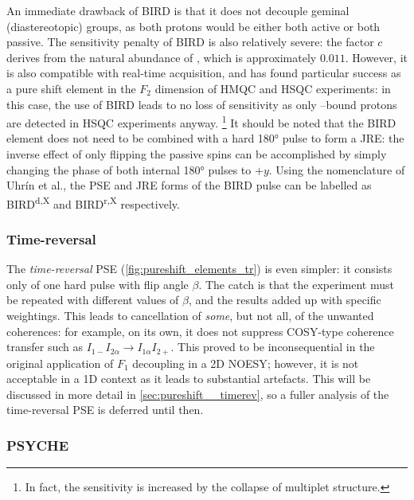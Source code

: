 An immediate drawback of BIRD is that it does not decouple geminal (diastereotopic)  groups, as both protons would be either both active or both passive.
The sensitivity penalty of BIRD is also relatively severe: the factor $c$ derives from the natural abundance of \carbon{}, which is approximately $0.011$.
However, it is also compatible with real-time acquisition\autocite{Lupulescu2012JMR}, and has found particular success as a pure shift element in the $F_2$ dimension of HMQC and HSQC experiments\autocite{Sakhaii2009JMR,Paudel2013ACIE,Reinsperger2014JMR,Kiraly2018MRC,Nolis2019JMR_psHSQC,Singh2020JMR}: in this case, the use of BIRD leads to no loss of sensitivity as only \carbon{}--bound protons are detected in HSQC experiments anyway.%
\footnote{In fact, the sensitivity is increased by the collapse of multiplet structure.}
It should be noted that the BIRD element does not need to be combined with a hard \ang{180} pulse to form a JRE: the inverse effect of only flipping the passive spins can be accomplished by simply changing the phase of both internal \ang{180} pulses to $+y$.
Using the nomenclature of Uhr{\'i}n et al.,\autocite{Uhrin1993JMRSA} the PSE and JRE forms of the BIRD pulse can be labelled as BIRD\textsuperscript{d,X} and BIRD\textsuperscript{r,X} respectively.

\subsubsection{Time-reversal}

The \textit{time-reversal} PSE (\cref{fig:pureshift_elements_tr}) is even simpler: it consists only of one hard pulse with flip angle $\beta$\autocite{Sorensen1985JACS}.
The catch is that the experiment must be repeated with different values of $\beta$, and the results added up with specific weightings.\autocite{Griesinger1986JCP}
This leads to cancellation of \textit{some}, but not all, of the unwanted coherences: for example, on its own, it does not suppress COSY-type coherence transfer such as $I_{1-}I_{2\alpha} \to I_{1\alpha}I_{2+}$.
This proved to be inconsequential in the original application of $F_1$ decoupling in a 2D NOESY\autocite{Sorensen1985JACS}; however, it is not acceptable in a 1D context as it leads to substantial artefacts.
This will be discussed in more detail in \cref{sec:pureshift__timerev}, so a fuller analysis of the time-reversal PSE is deferred until then.


\subsubsection{PSYCHE}

